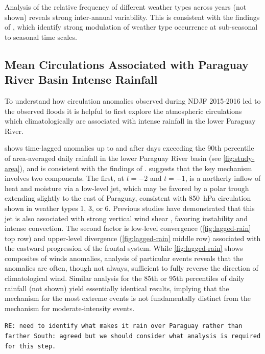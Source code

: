 \documentclass[twocol]{ametsoc}
\begin{document}
Analysis of the relative frequency of different weather types across years (not shown) reveals strong inter-annual variability.
This is consistent with the findings of \citet{Munoz2015,Munoz2016}, which identify strong modulation of weather type occurrence at sub-seasonal to seasonal time scales.

\subsection{Mean Circulations Associated with Paraguay River Basin Intense Rainfall} \label{sec:rainfall-circulation}

To understand how circulation anomalies observed during NDJF 2015-2016 led to the observed floods it is helpful to first explore the atmospheric circulations which climatologically are associated with intense rainfall in the lower Paraguay River.

 shows time-lagged anomalies up to and after days exceeding the 90th percentile of area-averaged daily rainfall in the lower Paraguay River basin (see \cref{fig:study-area}), and is consistent with the findings of \citet{Marengo2004,Salio:2007gd}.
 suggests that the key mechanism involves two components.
The first, at $t=-2$ and $t=-1$, is a northerly inflow of heat and moisture via a low-level jet, which may be favored by a polar trough extending slightly to the east of Paraguay, consistent with \SI{850}{\hecto\pascal} circulation shown in weather types 1, 3, or 6.
Previous studies have demonstrated that this jet is also associated with strong vertical wind shear \citep{Marengo2004,Silva2009}, favoring instability and intense convection.
The second factor is low-level convergence (\cref{fig:lagged-rain} top row) and upper-level divergence (\cref{fig:lagged-rain} middle row) associated with the eastward progression of the frontal system.
While \cref{fig:lagged-rain} shows composites of winds anomalies, analysis of particular events reveals that the anomalies are often, though not always, sufficient to fully reverse the direction of climatological wind.
Similar analysis for the 85th or 95th percentiles of daily rainfall (not shown) yield essentially identical results, implying that the mechanism for the most extreme events is not fundamentally distinct from the mechanism for moderate-intensity events.

\texttt{RE: need to identify what makes it rain over Paraguay rather than farther South: agreed but we should consider what analysis is required for this step.}
\end{document}
